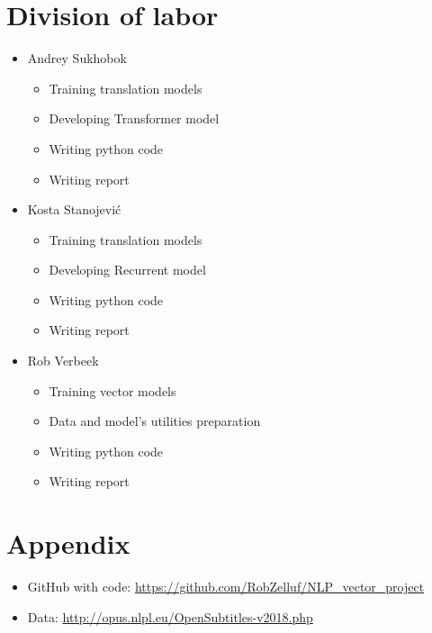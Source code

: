 \documentclass{article}
\begin{document}
\newpage

\printbibliography

\newpage

\section*{Division of labor}

\begin{itemize}
  \item Andrey Sukhobok
    \begin{itemize}
        \item Training translation models
        \item Developing Transformer model
        \item Writing python code
        \item Writing report
    \end{itemize}
  \item Kosta Stanojević
    \begin{itemize}
        \item Training translation models
        \item Developing Recurrent model
        \item Writing python code
        \item Writing report
    \end{itemize}
  \item Rob Verbeek
    \begin{itemize}
        \item Training vector models
        \item Data and model's utilities preparation
        \item Writing python code
        \item Writing report
    \end{itemize}
\end{itemize}

\section*{Appendix}

\begin{itemize}
  \item GitHub with code: \url{https://github.com/RobZelluf/NLP_vector_project}
  \item Data: \url{http://opus.nlpl.eu/OpenSubtitles-v2018.php}
\end{itemize}
\end{document}
